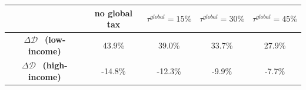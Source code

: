 \begin{tabular}{ccccc}
\toprule
&
no global tax &
$\tau^{global}=15\%$ &
$\tau^{global}=30\%$ &
$\tau^{global}=45\%$ \\
\midrule
$\Delta\mathscr{D}$ \ \textbf{(low-income)} & 43.9\% & 39.0\% & 33.7\% & 27.9\% \\
$\Delta\mathscr{D}$ \ \textbf{(high-income)} & -14.8\% & -12.3\% & -9.9\% & -7.7\% \\
\bottomrule
\end{tabular}
